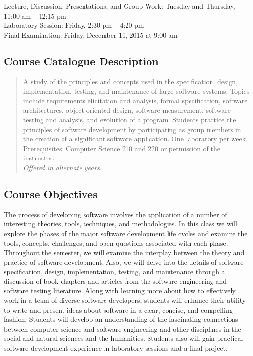 Lecture, Discussion, Presentations, and Group Work: Tuesday and Thursday, 11:00 am -- 12:15 pm \\
Laboratory Session: Friday, 2:30 pm -- 4:20 pm \\
Final Examination: Friday, December 11, 2015 at 9:00 am

\subsection*{Course Catalogue Description}

\begin{quote}

    A study of the principles and concepts used in the specification, design, implementation, testing, and maintenance
    of large software systems. Topics include requirements elicitation and analysis, formal specification, software
    architectures, object-oriented design, software measurement, software testing and analysis, and evolution of a
    program.  Students practice the principles of software development by participating as group members in the creation
    of a significant software application. One laboratory per week. Prerequisites: Computer Science 210 and 220 or
    permission of the instructor. \\ {\em Offered in alternate years}.

\end{quote}

\subsection*{Course Objectives}

The process of developing software involves the application of a number of interesting theories, tools, techniques, and
methodologies.  In this class we will explore the phases of the major software development life cycles and examine the
tools, concepts, challenges, and open questions associated with each phase.  Throughout the semester, we will examine
the interplay between the theory and practice of software development.  Also, we will delve into the details of software
specification, design, implementation, testing, and maintenance through a discussion of book chapters and articles from
the software engineering and software testing literature.  Along with learning more about how to effectively work in a
team of diverse software developers, students will enhance their ability to write and present ideas about software in a
clear, concise, and compelling fashion.  Students will develop an understanding of the fascinating connections
between computer science and software engineering and other disciplines in the social and natural sciences and the
humanities.  Students also will gain practical software development experience in laboratory sessions and a final
project.

